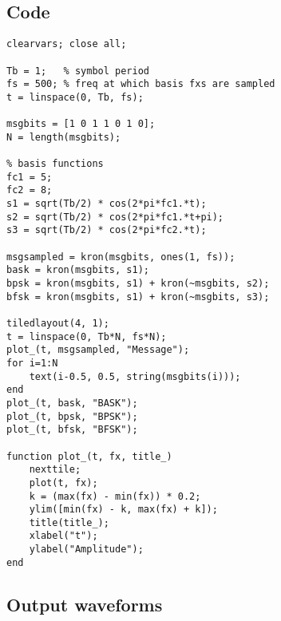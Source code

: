 \documentclass[12pt,a4paper]{report}
\begin{document}
\subsection*{Code}
\begin{verbatim}
clearvars; close all;

Tb = 1;   % symbol period
fs = 500; % freq at which basis fxs are sampled
t = linspace(0, Tb, fs);

msgbits = [1 0 1 1 0 1 0];
N = length(msgbits);

% basis functions
fc1 = 5;
fc2 = 8;
s1 = sqrt(Tb/2) * cos(2*pi*fc1.*t);
s2 = sqrt(Tb/2) * cos(2*pi*fc1.*t+pi);
s3 = sqrt(Tb/2) * cos(2*pi*fc2.*t);

msgsampled = kron(msgbits, ones(1, fs));
bask = kron(msgbits, s1);
bpsk = kron(msgbits, s1) + kron(~msgbits, s2);
bfsk = kron(msgbits, s1) + kron(~msgbits, s3);

tiledlayout(4, 1);
t = linspace(0, Tb*N, fs*N);
plot_(t, msgsampled, "Message");
for i=1:N
    text(i-0.5, 0.5, string(msgbits(i)));
end
plot_(t, bask, "BASK");
plot_(t, bpsk, "BPSK");
plot_(t, bfsk, "BFSK");

function plot_(t, fx, title_)
    nexttile;
    plot(t, fx);
    k = (max(fx) - min(fx)) * 0.2;
    ylim([min(fx) - k, max(fx) + k]);
    title(title_);
    xlabel("t");
    ylabel("Amplitude");
end

\end{verbatim}

\subsection*{Output waveforms}
\begin{figure*}[!h]
    
\end{figure*}
\end{document}
